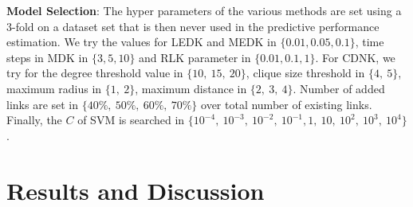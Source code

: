 \documentclass[runningheads,a4paper]{llncs}
\begin{document}
\textbf{Model Selection}: The hyper parameters of the various methods are set using a 3-fold on a dataset set that is then never used in the predictive performance estimation. We try the values for LEDK and MEDK in $\lbrace  0.01, 0.05, 0.1 \rbrace$, time steps in MDK in $\lbrace 3, 5, 10 \rbrace$ and RLK parameter in $\lbrace 0.01, 0.1, 1 \rbrace$. For CDNK, we try for the degree threshold value in $\lbrace 10,\ 15,\ 20 \rbrace$, clique size threshold in $\lbrace 4,\ 5 \rbrace$, maximum radius in $\lbrace 1,\ 2 \rbrace$, maximum distance in $\lbrace 2,\ 3,\ 4 \rbrace$. Number of added links are set in $\lbrace 40\%,\ 50\%,\ 60\%,\ 70\% \rbrace$ over total number of existing links. Finally, the $C$ of SVM is searched in $\lbrace 10^{-4},  \ 10^{-3}, \ 10^{-2},\ 10^{-1}, 1,\ 10,\ 10^2, \ 10^3,\ 10^4 \rbrace$.

\section{Results and Discussion}
\label{results-discussion}
\end{document}
